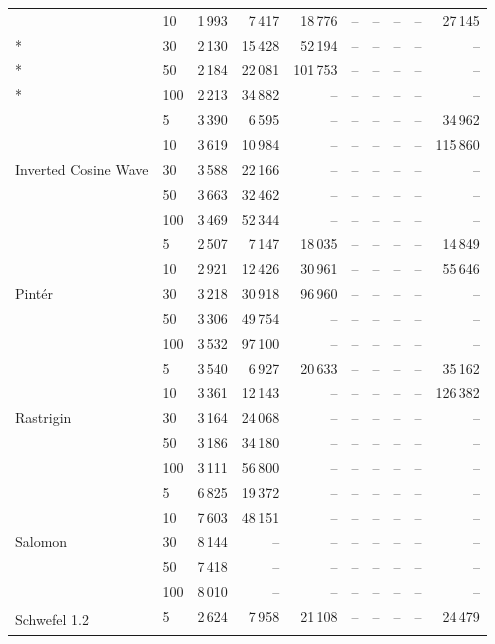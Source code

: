 {\begin{longtable}{llrrrrrrrr}
 & 10 & 1\,993 & 7\,417 & 18\,776 & -- & -- & -- & -- & 27\,145 \\*
 & 30 & 2\,130 & 15\,428 & 52\,194 & -- & -- & -- & -- & -- \\*
 & 50 & 2\,184 & 22\,081 & 101\,753 & -- & -- & -- & -- & -- \\*
 & 100 & 2\,213 & 34\,882 & -- & -- & -- & -- & -- & -- \\
\midrule
\multirow{5}{*}{Inverted Cosine Wave} & 5 & 3\,390 & 6\,595 & -- & -- & -- & -- & -- & 34\,962 \\*
 & 10 & 3\,619 & 10\,984 & -- & -- & -- & -- & -- & 115\,860 \\*
 & 30 & 3\,588 & 22\,166 & -- & -- & -- & -- & -- & -- \\*
 & 50 & 3\,663 & 32\,462 & -- & -- & -- & -- & -- & -- \\*
 & 100 & 3\,469 & 52\,344 & -- & -- & -- & -- & -- & -- \\
\midrule
\multirow{5}{*}{Pint\'er} & 5 & 2\,507 & 7\,147 & 18\,035 & -- & -- & -- & -- & 14\,849 \\*
 & 10 & 2\,921 & 12\,426 & 30\,961 & -- & -- & -- & -- & 55\,646 \\*
 & 30 & 3\,218 & 30\,918 & 96\,960 & -- & -- & -- & -- & -- \\*
 & 50 & 3\,306 & 49\,754 & -- & -- & -- & -- & -- & -- \\*
 & 100 & 3\,532 & 97\,100 & -- & -- & -- & -- & -- & -- \\
\midrule
\multirow{5}{*}{Rastrigin} & 5 & 3\,540 & 6\,927 & 20\,633 & -- & -- & -- & -- & 35\,162 \\*
 & 10 & 3\,361 & 12\,143 & -- & -- & -- & -- & -- & 126\,382 \\*
 & 30 & 3\,164 & 24\,068 & -- & -- & -- & -- & -- & -- \\*
 & 50 & 3\,186 & 34\,180 & -- & -- & -- & -- & -- & -- \\*
 & 100 & 3\,111 & 56\,800 & -- & -- & -- & -- & -- & -- \\
\midrule
\multirow{5}{*}{Salomon} & 5 & 6\,825 & 19\,372 & -- & -- & -- & -- & -- & -- \\*
 & 10 & 7\,603 & 48\,151 & -- & -- & -- & -- & -- & -- \\*
 & 30 & 8\,144 & -- & -- & -- & -- & -- & -- & -- \\*
 & 50 & 7\,418 & -- & -- & -- & -- & -- & -- & -- \\*
 & 100 & 8\,010 & -- & -- & -- & -- & -- & -- & -- \\
\midrule
\multirow{5}{*}{Schwefel 1.2} & 5 & 2\,624 & 7\,958 & 21\,108 & -- & -- & -- & -- & 24\,479 \\*

\end{longtable}}
